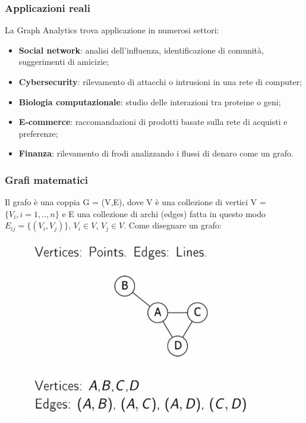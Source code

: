 \subsubsection*{Applicazioni reali}

La Graph Analytics trova applicazione in numerosi settori:
\begin{itemize}
    \item \textbf{Social network}: analisi dell'influenza, identificazione di comunità, suggerimenti di amicizie;
    \item \textbf{Cybersecurity}: rilevamento di attacchi o intrusioni in una rete di computer;
    \item \textbf{Biologia computazionale}: studio delle interazioni tra proteine o geni;
    \item \textbf{E-commerce}: raccomandazioni di prodotti basate sulla rete di acquisti e preferenze;
    \item \textbf{Finanza}: rilevamento di frodi analizzando i flussi di denaro come un grafo.
\end{itemize}

\subsubsection*{Grafi matematici}

Il grafo è una coppia G = (V,E), dove V è una collezione di vertici V = $\{V_i, i=1,..,n\}$
e E una collezione di archi (edges) fatta in questo modo $E_{ij} = \{(V_i, V_j)\}$, $V_i \in V$, $V_j \in V$. Come disegnare un grafo: 
\\
\begin{figure}[th]
    \centering
    \includegraphics[scale=0.3]{Introduction/img/graphdesign.png}
    \label{fig:des}
\end{figure}

